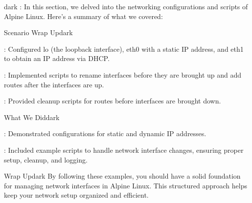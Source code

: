 \begin{baseBoxThree}{}{dark}
    \bigskip
    : In this section, we delved into the networking configurations and scripts of Alpine Linux. Here's a summary of what we covered:
    \bigskip
    \label{Scenario Wrap Up}
    \begin{baseBoxThree}{Scenario Wrap Up}{dark}
        \begin{posnexItemize}
            \item[\sA] : Configured lo (the loopback interface), eth0 with a static IP address, and eth1 to obtain an IP address via DHCP.
            \item[\sA] : Implemented scripts to rename interfaces before they are brought up and add routes after the interfaces are up.
            \item[\sA] : Provided cleanup scripts for routes before interfaces are brought down.
        \end{posnexItemize}
    \end{baseBoxThree}
    \smallskip
    \begin{baseBoxThree}{What We Did}{dark}
        \begin{posnexItemize}
            \item[\sA] : Demonstrated configurations for static and dynamic IP addresses.
            \item[\sA] : Included example scripts to handle network interface changes, ensuring proper setup, cleanup, and logging.
        \end{posnexItemize}
    \end{baseBoxThree}
    \smallskip
    \begin{baseBoxThree}{Wrap Up}{dark}
        By following these examples, you should have a solid foundation for managing network interfaces in Alpine Linux.
        This structured approach helps keep your network setup organized and efficient.
    \end{baseBoxThree}
\end{baseBoxThree}
